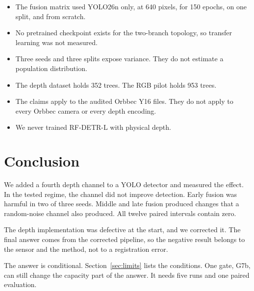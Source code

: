 \documentclass[preprint,12pt]{elsarticle}
\newcommand{\G}[1]{G#1}
\begin{document}
\begin{itemize}
\item The fusion matrix used YOLO26n only, at 640 pixels, for 150 epochs, on one
split, and from scratch.
\item No pretrained checkpoint exists for the two-branch topology, so transfer
learning was not measured.
\item Three seeds and three splits expose variance. They do not estimate a
population distribution.
\item The depth dataset holds 352 trees. The RGB pilot holds 953 trees.
\item The claims apply to the audited Orbbec Y16 files. They do not apply to
every Orbbec camera or every depth encoding.
\item We never trained RF-DETR-L with physical depth.
\end{itemize}

\section{Conclusion}
\label{sec:conclusion}

We added a fourth depth channel to a YOLO detector and measured the effect. In
the tested regime, the channel did not improve detection. Early fusion was
harmful in two of three seeds. Middle and late fusion produced changes that a
random-noise channel also produced. All twelve paired intervals contain zero.

The depth implementation was defective at the start, and we corrected it. The
final answer comes from the corrected pipeline, so the negative result belongs
to the sensor and the method, not to a registration error.

The answer is conditional. Section~\ref{sec:limits} lists the conditions.
One gate, \G{7b}, can still change the capacity part
of the answer. It needs five runs and one paired evaluation.
\end{document}
